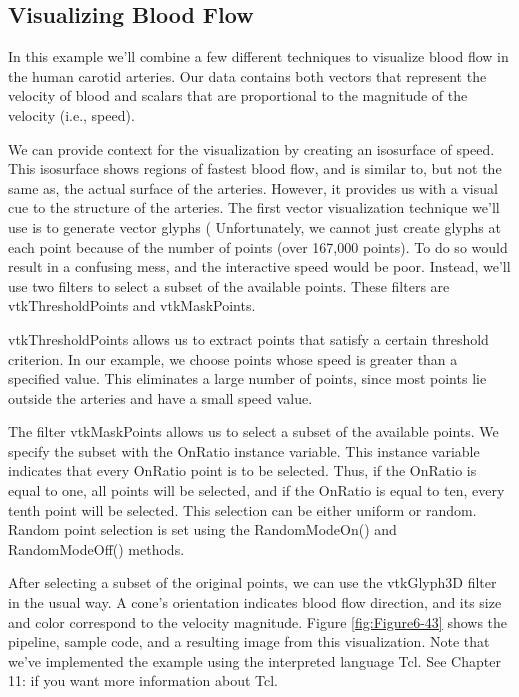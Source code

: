 \subsection{Visualizing Blood Flow}

In this example we'll combine a few different techniques to visualize blood flow in the human carotid arteries. Our data contains both vectors that represent the velocity of blood and scalars that are proportional to the magnitude of the velocity (i.e., speed).

We can provide context for the visualization by creating an isosurface of speed. This isosurface shows regions of fastest blood flow, and is similar to, but not the same as, the actual surface of the arteries. However, it provides us with a visual cue to the structure of the arteries. The first vector visualization technique we'll use is to generate vector glyphs ( Unfortunately, we cannot just create glyphs at each point because of the number of points (over 167,000 points). To do so would result in a confusing mess, and the interactive speed would be poor. Instead, we'll use two filters to select a subset of the available points. These filters are vtkThresholdPoints and vtkMaskPoints.

vtkThresholdPoints allows us to extract points that satisfy a certain threshold criterion. In our example, we choose points whose speed is greater than a specified value. This eliminates a large number of points, since most points lie outside the arteries and have a small speed value.

The filter vtkMaskPoints allows us to select a subset of the available points. We specify the subset with the OnRatio instance variable. This instance variable indicates that every OnRatio point is to be selected. Thus, if the OnRatio is equal to one, all points will be selected, and if the OnRatio is equal to ten, every tenth point will be selected. This selection can be either uniform or random. Random point selection is set using the RandomModeOn() and RandomModeOff() methods.

After selecting a subset of the original points, we can use the vtkGlyph3D filter in the usual way. A cone's orientation indicates blood flow direction, and its size and color correspond to the velocity magnitude. Figure \ref{fig:Figure6-43} shows the pipeline, sample code, and a resulting image from this visualization. Note that we've implemented the example using the interpreted language Tcl. See Chapter 11:  if you want more information about Tcl.


